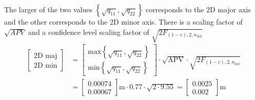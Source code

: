 The larger of the two values $\left\{\sqrt{q_{11}},\sqrt{q_{22}}\right\}$ corresponds to the 2D major axis and the other corresponds to the 2D minor axis.  There is a scaling factor of $\sqrt{APV}$ and a confidence level scaling factor of $\sqrt{2F_{(1-c),2,n_{\text{dof}}}}$
\begin{equation}
\begin{split}
\left[\begin{array}{c}\text{2D maj}\\\text{2D min}\end{array}\right]&=\left[\begin{array}{c}\text{max}\left\{\sqrt{q_{11}},\sqrt{q_{22}}\right\}\\\text{min}\left\{\sqrt{q_{11}},\sqrt{q_{22}}\right\}\end{array}\right]\cdot\sqrt{\text{APV}}\cdot\sqrt{2F_{(1-c),2,n_{\text{dof}}}}\\
&=\left[\begin{array}{c}0.00074\\0.00067\end{array}\right]\text{m}\cdot0.77\cdot\sqrt{2\cdot9.55}=\left[\begin{array}{c}0.0025\\0.002\end{array}\right]\text{m}
\end{split}
\end{equation}
{}\\


